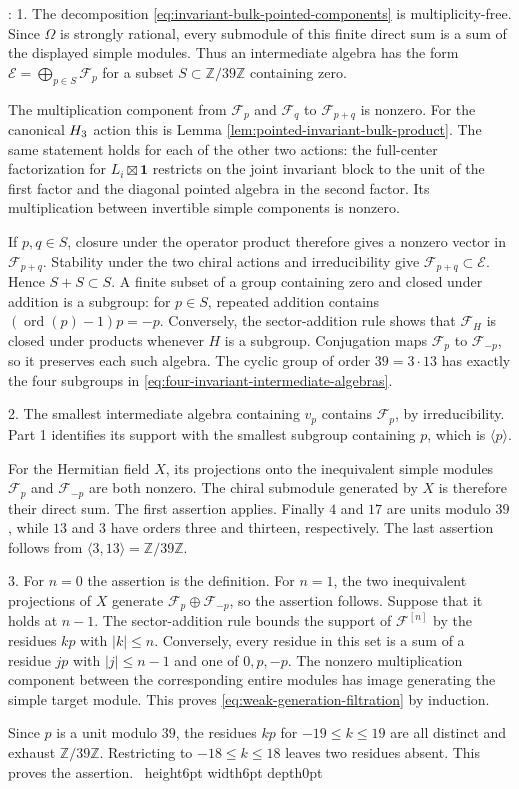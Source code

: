 \documentclass[leqno]{article}
\let\cal\relax
\newcommand{\cal}{\mathcal}
\newcommand{\Z}{\ensuremath{\mathbb{Z}}}
\renewcommand{\leq}{\ensuremath{\leqslant}}
\newcommand{\qed}{\hfill \vrule height6pt  width6pt depth0pt}
\newenvironment{proof}[1][]{\noindent {\it Proof #1} : }{\hbox{~}\qed
\smallskip
}
\numberwithin{equation}{section}
\begin{document}
\begin{proof}
1. The decomposition \eqref{eq:invariant-bulk-pointed-components} is multiplicity-free. Since $\Omega$ is strongly rational, every submodule of this finite direct sum is a sum of the displayed simple modules. Thus an intermediate algebra has the form $\mathscr E = \bigoplus_{p \in S}\mathscr F_p$ for a subset $S \subset \Z/39\Z$ containing zero.

The multiplication component from $\mathscr F_p$ and $\mathscr F_q$ to $\mathscr F_{p+q}$ is nonzero. For the canonical $\cal H_3$ action this is Lemma \ref{lem:pointed-invariant-bulk-product}. The same statement holds for each of the other two actions: the full-center factorization for $L_i\boxtimes\mathbf1$ restricts on the joint invariant block to the unit of the first factor and the diagonal pointed algebra in the second factor. Its multiplication between invertible simple components is nonzero.

If $p,q \in S$, closure under the operator product therefore gives a nonzero vector in $\mathscr F_{p+q}$. Stability under the two chiral actions and irreducibility give $\mathscr F_{p+q} \subset \mathscr E$. Hence $S+S \subset S$. A finite subset of a group containing zero and closed under addition is a subgroup: for $p \in S$, repeated addition contains $(\operatorname{ord}(p)-1)p = -p$. Conversely, the sector-addition rule shows that $\mathscr F_H$ is closed under products whenever $H$ is a subgroup. Conjugation maps $\mathscr F_p$ to $\mathscr F_{-p}$, so it preserves each such algebra. The cyclic group of order $39 = 3\cdot13$ has exactly the four subgroups in \eqref{eq:four-invariant-intermediate-algebras}.

2. The smallest intermediate algebra containing $v_p$ contains $\mathscr F_p$, by irreducibility. Part 1 identifies its support with the smallest subgroup containing $p$, which is $\langle p\rangle$.

For the Hermitian field $X$, its projections onto the inequivalent simple modules $\mathscr F_p$ and $\mathscr F_{-p}$ are both nonzero. The chiral submodule generated by $X$ is therefore their direct sum. The first assertion applies. Finally $4$ and $17$ are units modulo $39$, while $13$ and $3$ have orders three and thirteen, respectively. The last assertion follows from $\langle3,13\rangle = \Z/39\Z$.

3. For $n = 0$ the assertion is the definition. For $n = 1$, the two inequivalent projections of $X$ generate $\mathscr F_p\oplus\mathscr F_{-p}$, so the assertion follows. Suppose that it holds at $n-1$. The sector-addition rule bounds the support of $\mathscr F^{[n]}$ by the residues $kp$ with $|k| \leq n$. Conversely, every residue in this set is a sum of a residue $jp$ with $|j| \leq n-1$ and one of $0,p,-p$. The nonzero multiplication component between the corresponding entire modules has image generating the simple target module. This proves \eqref{eq:weak-generation-filtration} by induction.

Since $p$ is a unit modulo $39$, the residues $kp$ for $-19 \leq k \leq19$ are all distinct and exhaust $\Z/39\Z$. Restricting to $-18 \leq k \leq18$ leaves two residues absent. This proves the assertion.
\end{proof}
\end{document}

